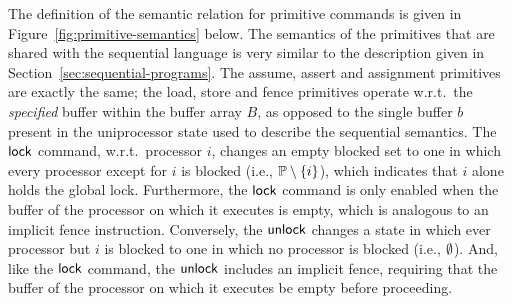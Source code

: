 \documentclass[11pt]{report}
\begin{document}
The definition of the semantic relation for primitive commands is given in Figure~\ref{fig:primitive-semantics} below. The semantics of the primitives that are shared with the sequential language is very similar to the description given in Section~\ref{sec:sequential-programs}. The assume, assert and assignment primitives are exactly the same; the load, store and fence primitives operate w.r.t.\ the \emph{specified} buffer within the buffer array $B$, as opposed to the single buffer $b$ present in the uniprocessor state used to describe the sequential semantics. The $\operatorname{\mathsf{lock}}$ command, w.r.t.\ processor $i$, changes an empty blocked set to one in which every processor except for $i$ is blocked (i.e., $\mathbb{P} \setminus \left\lbrace i \right\rbrace$), which indicates that $i$ alone holds the global lock. Furthermore, the $\operatorname{\mathsf{lock}}$ command is only enabled when the buffer of the processor on which it executes is empty, which is analogous to an implicit fence instruction. Conversely, the $\operatorname{\mathsf{unlock}}$ changes a state in which ever processor but $i$ is blocked to one in which no processor is blocked (i.e., $\operatorname{\emptyset}$). And, like the $\operatorname{\mathsf{lock}}$ command, the $\operatorname{\mathsf{unlock}}$ includes an implicit fence, requiring that the buffer of the processor on which it executes be empty before proceeding. 
\end{document}

